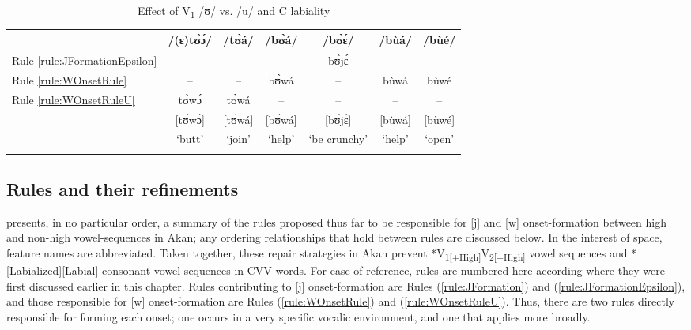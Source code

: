 \documentclass[output=paper,colorlinks,citecolor=brown]{langscibook}
\begin{document}
 \begin{table}
\caption{Effect of V\textsubscript{1} /ʊ/ vs. /u/ and C labiality}
\label{tab:Ordering2}
 \begin{tabular}{lcccccc}
  \lsptoprule
   & /(ɛ)tʊ̀ɔ́/	&/tʊ̀á/&	/bʊ̀á/	&/bʊ̀ɛ́/ &	/bùá/ 	&/bùé/\\
   \midrule
    Rule \ref{rule:JFormationEpsilon} & -- & -- & -- & bʊ̀jɛ́ & -- & -- \\
     Rule \ref{rule:WOnsetRule} & -- & -- & bʊ̀wá & -- & bùwá & bùwé \\
     Rule \ref{rule:WOnsetRuleU} & tʊ̀wɔ́ & tʊ̀wá & -- & -- & -- & -- \\  
     \midrule
     & [tʊ̀wɔ́]& [tʊ̀wá] & [bʊ̀wá] & [bʊ̀jɛ́] & [bùwá] & [bùwé] \\
     & `butt' & `join' & `help' & `be crunchy' & `help' & `open' \\
  \lspbottomrule
 \end{tabular}
 \end{table}

\subsection{Rules and their refinements}  \label{SEC:Rules}

 presents, in no particular order, a summary of the rules proposed thus far to be responsible for [j] and [w] onset-formation between high and non-high vowel-sequences in Akan; any ordering relationships that hold between rules are discussed below. In the interest of space, feature names are abbreviated. Taken together, these repair strategies in Akan prevent *V\textsubscript{1[+High]}V\textsubscript{2[−High]} vowel sequences and *[Labialized][Labial]  consonant-vowel sequences in CVV words. For ease of reference, rules are numbered here according where they were first discussed earlier in this chapter. Rules contributing to [j] onset-formation are Rules (\ref{rule:JFormation}) and (\ref{rule:JFormationEpsilon}), and those responsible for [w] onset-formation are Rules (\ref{rule:WOnsetRule}) and (\ref{rule:WOnsetRuleU}). Thus, there are two rules directly responsible for forming each onset; one occurs in a very specific vocalic environment, and one that applies more broadly.
\end{document}
